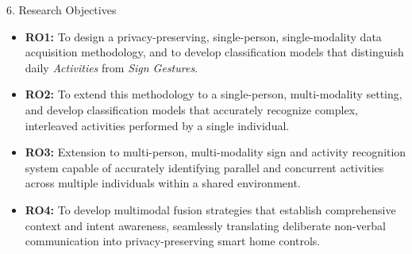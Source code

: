 \documentclass[aspectratio=169,11pt]{beamer}
\begin{document}

\begin{frame}{6. Research Objectives}
\justifying
\small
\begin{itemize}
    \item \textbf{RO1:} To design a privacy-preserving, single-person, single-modality data acquisition methodology, and to develop classification models that distinguish daily \textit{Activities} from \textit{Sign Gestures}.

    \item \textbf{RO2:} To extend this methodology to a single-person, multi-modality setting, and develop classification models that accurately recognize complex, interleaved activities performed by a single individual.

    \item \textbf{RO3:} Extension to multi-person, multi-modality sign and activity recognition system  capable of accurately identifying  parallel and concurrent activities across multiple individuals within a shared environment.

    \item \textbf{RO4:} To develop multimodal fusion strategies that establish comprehensive context and intent awareness, seamlessly translating deliberate non-verbal communication into privacy-preserving smart home controls.
\end{itemize}
\end{frame}

\end{document}
